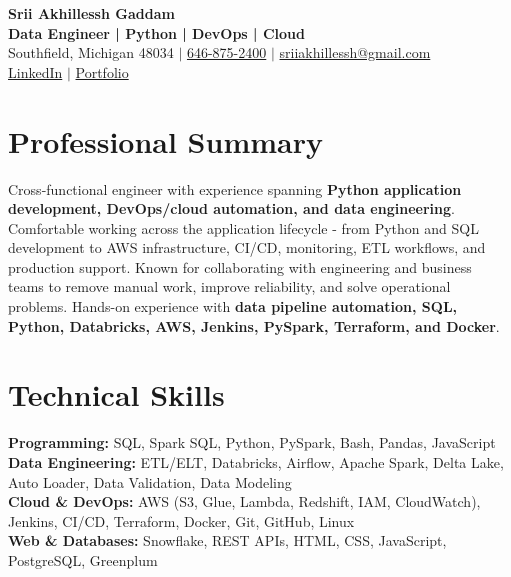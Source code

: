 \documentclass[letterpaper,10pt]{article}
\begin{document}
\fontsize{9.35pt}{10.45pt}\selectfont

\begin{center}
    {\LARGE \textbf{Srii Akhillessh Gaddam}} \\[-1pt]
    \textbf{Data Engineer | Python | DevOps | Cloud} \\[2pt]
    Southfield, Michigan 48034 $|$
    \href{tel:6468752400}{646-875-2400} $|$
    \href{mailto:sriiakhillessh@gmail.com}{sriiakhillessh@gmail.com} \\[1pt]
    \href{https://www.linkedin.com/in/srii-akhiilessh-gaddam-b48668191/}{LinkedIn} $|$
    \href{https://sriiakhillesshg.github.io/portfolio/}{Portfolio}
\end{center}
\vspace{-8pt}

\section{Professional Summary}
\small{Cross-functional engineer with experience spanning \textbf{Python application development, DevOps/cloud automation, and data engineering}. Comfortable working across the application lifecycle - from Python and SQL development to AWS infrastructure, CI/CD, monitoring, ETL workflows, and production support. Known for collaborating with engineering and business teams to remove manual work, improve reliability, and solve operational problems. Hands-on experience with \textbf{data pipeline automation, SQL, Python, Databricks, AWS, Jenkins, PySpark, Terraform, and Docker}.}

\section{Technical Skills}
\small{
\textbf{Programming:} SQL, Spark SQL, Python, PySpark, Bash, Pandas, JavaScript \\
\textbf{Data Engineering:} ETL/ELT, Databricks, Airflow, Apache Spark, Delta Lake, Auto Loader, Data Validation, Data Modeling \\
\textbf{Cloud \& DevOps:} AWS (S3, Glue, Lambda, Redshift, IAM, CloudWatch), Jenkins, CI/CD, Terraform, Docker, Git, GitHub, Linux \\
\textbf{Web \& Databases:} Snowflake, REST APIs, HTML, CSS, JavaScript, PostgreSQL, Greenplum
}

\end{document}
